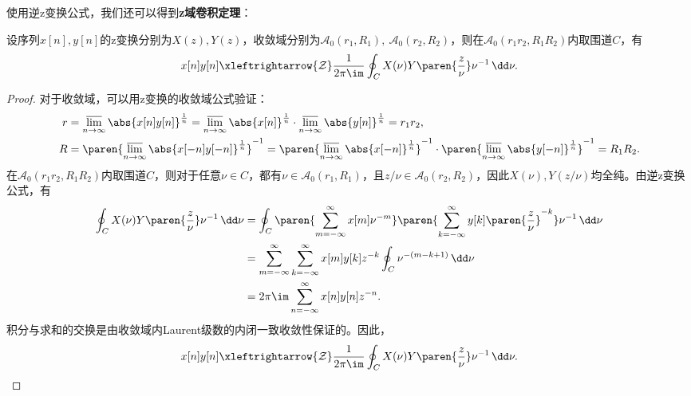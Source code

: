 使用逆z变换公式，我们还可以得到\textbf{z域卷积定理}：
\begin{theorem}[z域卷积定理]
    设序列$x[n],y[n]$的z变换分别为$X(z),Y(z)$，收敛域分别为$\mathcal{A}_0(r_1,R_1),\ \mathcal{A}_0(r_2,R_2)$，则在$\mathcal{A}_0(r_1 r_2,R_1 R_2)$内取围道$C$，有
    \begin{equation}
        x[n]y[n]\xleftrightarrow{\mathcal{Z}}\frac{1}{2\pi\im}\oint_{C}X(\nu)Y\paren{\frac{z}{\nu}}\nu^{-1}\,\dd\nu.
    \end{equation}
\end{theorem}
\begin{proof}
    对于收敛域，可以用z变换的收敛域公式验证：
    \begin{align}
        r & =\varlimsup_{n\to\infty}\abs{x[n]y[n]}^{\frac{1}{n}}=\varlimsup_{n\to\infty}\abs{x[n]}^{\frac{1}{n}}\cdot\varlimsup_{n\to\infty}\abs{y[n]}^{\frac{1}{n}}=r_1 r_2,                                            \\
        R & =\paren{\varlimsup_{n\to\infty}\abs{x[-n]y[-n]}^{\frac{1}{n}}}^{-1}=\paren{\varlimsup_{n\to\infty}\abs{x[-n]}^{\frac{1}{n}}}^{-1}\cdot\paren{\varlimsup_{n\to\infty}\abs{y[-n]}^{\frac{1}{n}}}^{-1}=R_1 R_2.
    \end{align}
    在$\mathcal{A}_0(r_1 r_2,R_1 R_2)$内取围道$C$，则对于任意$\nu\in C$，都有$\nu\in\mathcal{A}_0(r_1,R_1)$，且$z/\nu\in\mathcal{A}_0(r_2,R_2)$，因此$X(\nu),Y(z/\nu)$均全纯。由逆z变换公式，有
    \begin{align}
        \oint_{C}X(\nu)Y\paren{\frac{z}{\nu}}\nu^{-1}\,\dd\nu & =\oint_{C}\paren{\sum_{m=-\infty}^{\infty}x[m]\nu^{-m}}\paren{\sum_{k=-\infty}^{\infty}y[k]\paren{\frac{z}{\nu}}^{-k}}\nu^{-1}\,\dd\nu\nonumber \\
                                                              & =\sum_{m=-\infty}^{\infty}\sum_{k=-\infty}^{\infty}x[m]y[k]z^{-k}\oint_{C}\nu^{-(m-k+1)}\,\dd\nu\nonumber                                       \\
                                                              & =2\pi\im\sum_{n=-\infty}^{\infty}x[n]y[n]z^{-n}.
    \end{align}
    积分与求和的交换是由收敛域内Laurent级数的内闭一致收敛性保证的。因此，
    \begin{equation}
        x[n]y[n]\xleftrightarrow{\mathcal{Z}}\frac{1}{2\pi\im}\oint_{C}X(\nu)Y\paren{\frac{z}{\nu}}\nu^{-1}\,\dd\nu.
    \end{equation}
\end{proof}


